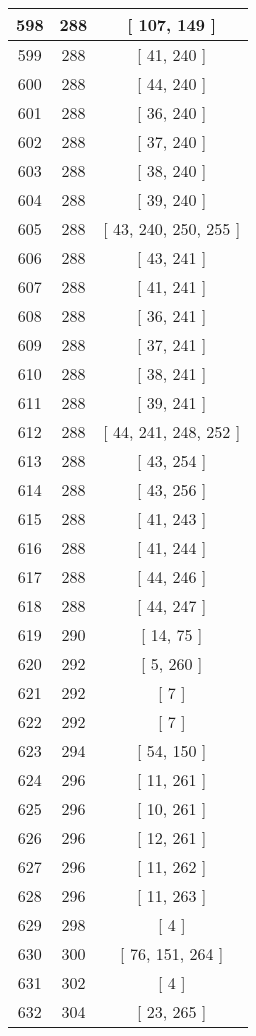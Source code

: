 \begin{center}
\begin{longtable}[H]{|| c c c ||}
\hline
598 & 288 & [ 107, 149 ] \\ 
\hline
599 & 288 & [ 41, 240 ] \\ 
\hline
600 & 288 & [ 44, 240 ] \\ 
\hline
601 & 288 & [ 36, 240 ] \\ 
\hline
602 & 288 & [ 37, 240 ] \\ 
\hline
603 & 288 & [ 38, 240 ] \\ 
\hline
604 & 288 & [ 39, 240 ] \\ 
\hline
605 & 288 & [ 43, 240, 250, 255 ] \\ 
\hline
606 & 288 & [ 43, 241 ] \\ 
\hline
607 & 288 & [ 41, 241 ] \\ 
\hline
608 & 288 & [ 36, 241 ] \\ 
\hline
609 & 288 & [ 37, 241 ] \\ 
\hline
610 & 288 & [ 38, 241 ] \\ 
\hline
611 & 288 & [ 39, 241 ] \\ 
\hline
612 & 288 & [ 44, 241, 248, 252 ] \\ 
\hline
613 & 288 & [ 43, 254 ] \\ 
\hline
614 & 288 & [ 43, 256 ] \\ 
\hline
615 & 288 & [ 41, 243 ] \\ 
\hline
616 & 288 & [ 41, 244 ] \\ 
\hline
617 & 288 & [ 44, 246 ] \\ 
\hline
618 & 288 & [ 44, 247 ] \\ 
\hline
619 & 290 & [ 14, 75 ] \\ 
\hline
620 & 292 & [ 5, 260 ] \\ 
\hline
621 & 292 & [ 7 ] \\ 
\hline
622 & 292 & [ 7 ] \\ 
\hline
623 & 294 & [ 54, 150 ] \\ 
\hline
624 & 296 & [ 11, 261 ] \\ 
\hline
625 & 296 & [ 10, 261 ] \\ 
\hline
626 & 296 & [ 12, 261 ] \\ 
\hline
627 & 296 & [ 11, 262 ] \\ 
\hline
628 & 296 & [ 11, 263 ] \\ 
\hline
629 & 298 & [ 4 ] \\ 
\hline
630 & 300 & [ 76, 151, 264 ] \\ 
\hline
631 & 302 & [ 4 ] \\ 
\hline
632 & 304 & [ 23, 265 ] \\ 

\end{longtable}
\end{center}
